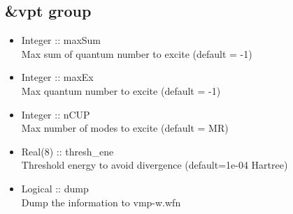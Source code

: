 \documentclass[a4paper,12pt]{article}
\begin{document}
\subsection{\&vpt group}
   \begin{itemize}
     \item Integer :: maxSum \\
       Max sum of quantum number to excite (default = -1)
     \item Integer :: maxEx \\
       Max quantum number to excite (default = -1)
     \item Integer :: nCUP \\
       Max number of modes to excite (default = MR)
     \item Real(8) :: thresh\_ene \\
       Threshold energy to avoid divergence (default=1e-04 Hartree)
     \item Logical :: dump \\
       Dump the information to vmp-w.wfn
   \end{itemize}
\end{document}
